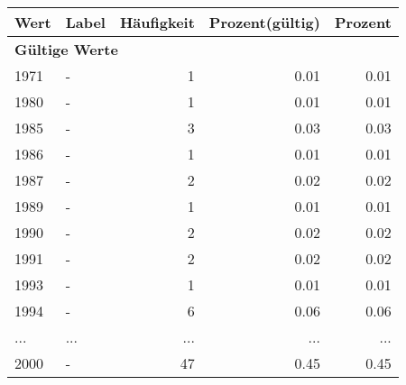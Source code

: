      \begin{longtable}{lXrrr}
     \toprule
     \textbf{Wert} & \textbf{Label} & \textbf{Häufigkeit} & \textbf{Prozent(gültig)} & \textbf{Prozent} \\
     \endhead
     \midrule
     \multicolumn{5}{l}{\textbf{Gültige Werte}}\\
        1971 & \multicolumn{1}{X}{-} & %
          \num{1} &
          \num[round-mode=places,round-precision=2]{0.01} &
          \num[round-mode=places,round-precision=2]{0.01} \\
        1980 & \multicolumn{1}{X}{-} & %
          \num{1} &
          \num[round-mode=places,round-precision=2]{0.01} &
          \num[round-mode=places,round-precision=2]{0.01} \\
        1985 & \multicolumn{1}{X}{-} & %
          \num{3} &
          \num[round-mode=places,round-precision=2]{0.03} &
          \num[round-mode=places,round-precision=2]{0.03} \\
        1986 & \multicolumn{1}{X}{-} & %
          \num{1} &
          \num[round-mode=places,round-precision=2]{0.01} &
          \num[round-mode=places,round-precision=2]{0.01} \\
        1987 & \multicolumn{1}{X}{-} & %
          \num{2} &
          \num[round-mode=places,round-precision=2]{0.02} &
          \num[round-mode=places,round-precision=2]{0.02} \\
        1989 & \multicolumn{1}{X}{-} & %
          \num{1} &
          \num[round-mode=places,round-precision=2]{0.01} &
          \num[round-mode=places,round-precision=2]{0.01} \\
        1990 & \multicolumn{1}{X}{-} & %
          \num{2} &
          \num[round-mode=places,round-precision=2]{0.02} &
          \num[round-mode=places,round-precision=2]{0.02} \\
        1991 & \multicolumn{1}{X}{-} & %
          \num{2} &
          \num[round-mode=places,round-precision=2]{0.02} &
          \num[round-mode=places,round-precision=2]{0.02} \\
        1993 & \multicolumn{1}{X}{-} & %
          \num{1} &
          \num[round-mode=places,round-precision=2]{0.01} &
          \num[round-mode=places,round-precision=2]{0.01} \\
        1994 & \multicolumn{1}{X}{-} & %
          \num{6} &
          \num[round-mode=places,round-precision=2]{0.06} &
          \num[round-mode=places,round-precision=2]{0.06} \\
       ... & ... & ... & ... & ... \\
        2000 & \multicolumn{1}{X}{-} & %
          \num{47} &
          \num[round-mode=places,round-precision=2]{0.45} &
          \num[round-mode=places,round-precision=2]{0.45} \\


\end{longtable}
